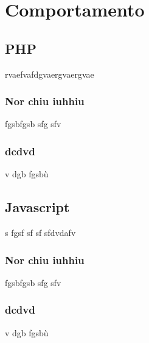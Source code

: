 \section{Comportamento}
	\subsection{PHP}
	rvaefvafdgvaergvaergvae
	 \subsubsection{Nor chiu iuhhiu}
	 fgsbfgsb sfg sfv 
	 \subsubsection{dcdvd}
	 v dgb fgsbù
	\subsection{Javascript}
	 s fgsf sf sf sfdvdafv
		\subsubsection{Nor chiu iuhhiu}
		fgsbfgsb sfg sfv 
		\subsubsection{dcdvd}
		v dgb fgsbù

		


